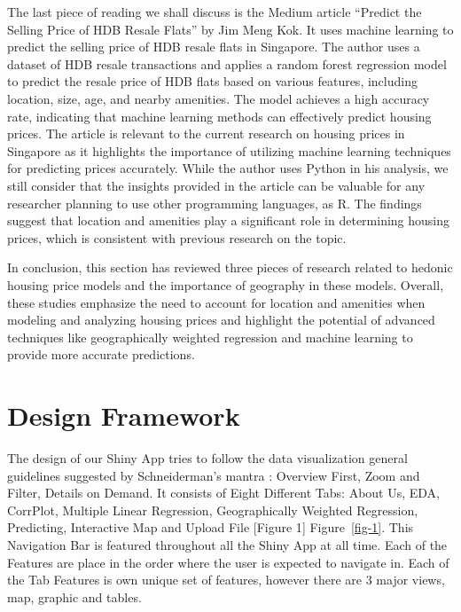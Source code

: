 \documentclass[manuscript,screen]{acmart}
\begin{document}
The last piece of reading we shall discuss is the Medium article
\citep{Kok21} ``Predict the Selling Price of HDB Resale Flats'' by Jim
Meng Kok. It uses machine learning to predict the selling price of HDB
resale flats in Singapore. The author uses a dataset of HDB resale
transactions and applies a random forest regression model to predict the
resale price of HDB flats based on various features, including location,
size, age, and nearby amenities. The model achieves a high accuracy
rate, indicating that machine learning methods can effectively predict
housing prices. The article is relevant to the current research on
housing prices in Singapore as it highlights the importance of utilizing
machine learning techniques for predicting prices accurately. While the
author uses Python in his analysis, we still consider that the insights
provided in the article can be valuable for any researcher planning to
use other programming languages, as R. The findings suggest that
location and amenities play a significant role in determining housing
prices, which is consistent with previous research on the topic.

In conclusion, this section has reviewed three pieces of research
related to hedonic housing price models and the importance of geography
in these models. Overall, these studies emphasize the need to account
for location and amenities when modeling and analyzing housing prices
and highlight the potential of advanced techniques like geographically
weighted regression and machine learning to provide more accurate
predictions.\\

\hypertarget{design-framework}{%
\section{\texorpdfstring{\textbf{Design
Framework}}{Design Framework}}\label{design-framework}}

The design of our Shiny App tries to follow the data visualization
general guidelines suggested by Schneiderman's mantra
\citep{shneiderman}: Overview First, Zoom and Filter, Details on Demand.
It consists of Eight Different Tabs: About Us, EDA, CorrPlot, Multiple
Linear Regression, Geographically Weighted Regression, Predicting,
Interactive Map and Upload File {[}Figure 1{]} Figure~\ref{fig-1}. This
Navigation Bar is featured throughout all the Shiny App at all time.
Each of the Features are place in the order where the user is expected
to navigate in. Each of the Tab Features is own unique set of features,
however there are 3 major views, map, graphic and tables.
\end{document}
